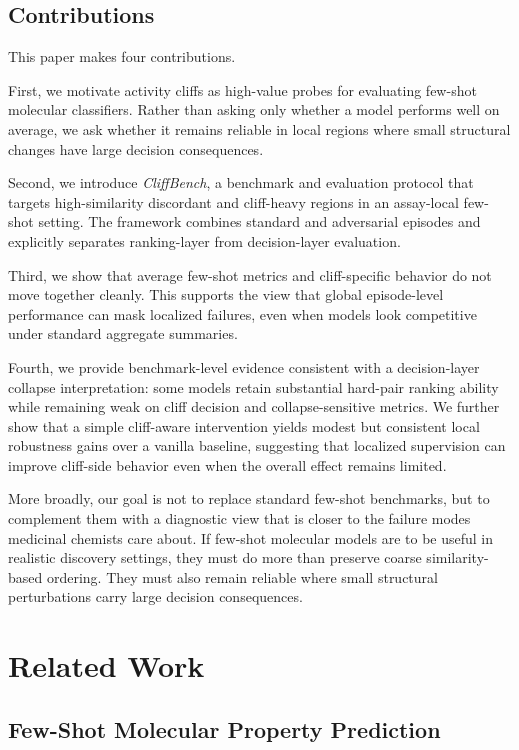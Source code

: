 \documentclass{article}
\begin{document}
\subsection{Contributions}

This paper makes four contributions.

First, we motivate activity cliffs as high-value probes for evaluating few-shot molecular classifiers. Rather than
asking only whether a model performs well on average, we ask whether it remains reliable in local regions where
small structural changes have large decision consequences.

Second, we introduce \emph{CliffBench}, a benchmark and evaluation protocol that targets high-similarity
discordant and cliff-heavy regions in an assay-local few-shot setting. The framework combines standard and
adversarial episodes and explicitly separates ranking-layer from decision-layer evaluation.

Third, we show that average few-shot metrics and cliff-specific behavior do not move together cleanly. This
supports the view that global episode-level performance can mask localized failures, even when models look
competitive under standard aggregate summaries.

Fourth, we provide benchmark-level evidence consistent with a decision-layer collapse interpretation: some models
retain substantial hard-pair ranking ability while remaining weak on cliff decision and collapse-sensitive
metrics. We further show that a simple cliff-aware intervention yields modest but consistent local robustness
gains over a vanilla baseline, suggesting that localized supervision can improve cliff-side behavior even when the
overall effect remains limited.

More broadly, our goal is not to replace standard few-shot benchmarks, but to complement them with a diagnostic
view that is closer to the failure modes medicinal chemists care about. If few-shot molecular models are to be
useful in realistic discovery settings, they must do more than preserve coarse similarity-based ordering. They
must also remain reliable where small structural perturbations carry large decision consequences.

\section{Related Work}

\subsection{Few-Shot Molecular Property Prediction}
\end{document}
